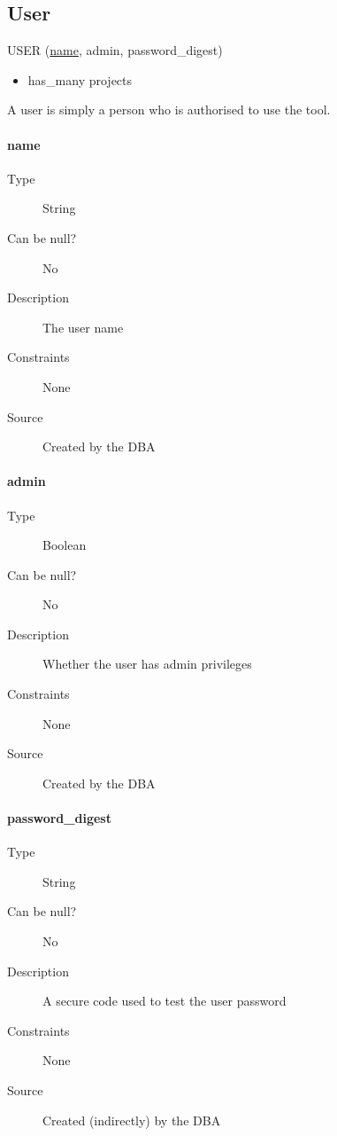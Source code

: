 \documentclass[]{report}
\begin{document}
\subsection{User}
USER (\underline{name}, admin, password\_digest)
\begin{itemize}
\item has\_many projects
\end{itemize}
A user is simply a person who is authorised to use the tool.
\paragraph{name}
	\begin{description}
	\item[Type]String
	\item[Can be null?]No
	\item[Description]The user name
	\item[Constraints]None
	\item[Source]Created by the DBA
	\end{description}
\paragraph{admin}
	\begin{description}
	\item[Type]Boolean
	\item[Can be null?]No
	\item[Description]Whether the user has admin privileges
	\item[Constraints]None
	\item[Source]Created by the DBA
	\end{description}
\paragraph{password\_digest}
	\begin{description}
	\item[Type]String
	\item[Can be null?]No
	\item[Description]A secure code used to test the user password
	\item[Constraints]None
	\item[Source]Created (indirectly) by the DBA
	\end{description}
\end{document}
